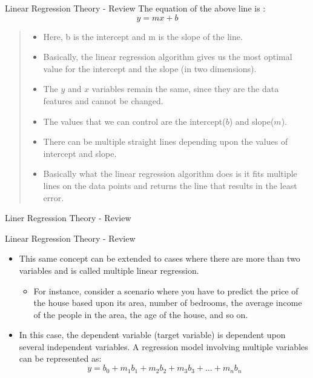 \documentclass[12pt,xcolor={dvipsnames}]{beamer}
\begin{document}
\begin{frame}[shrink=10]{Linear Regression Theory - Review}
The equation of the above line is :
$$ y= mx + b $$

\begin{quote}\small{
\begin{itemize}
\item Here, b is the intercept and m is the slope of the line.
\item Basically,
the linear regression algorithm gives us the most optimal value for the
intercept and the slope (in two dimensions).
\item The $y$ and $x$ variables
remain the same, since they are the data features and cannot be changed.
\item The values that we can control are the intercept($b$) and slope($m$).
\item There
can be multiple straight lines depending upon the values of intercept
and slope.
\item  Basically what the linear regression algorithm does is it
fits multiple lines on the data points and returns the line that results
in the least error.
\end{itemize}}
\end{quote}
\end{frame}

\begin{frame}{Liner Regression Theory - Review}
\begin{center}
\end{center}
\end{frame}

\begin{frame}{Linear Regression Theory - Review}
\begin{itemize}
\item This same concept can be extended to cases where there are more than two
variables and is called multiple linear regression.
\begin{itemize}
\item For instance, consider a scenario where you have to predict the price of the house
based upon its area, number of bedrooms, the average income of the
people in the area, the age of the house, and so on.
\end{itemize}
\item In this case, the dependent variable (target variable) is dependent upon several
independent variables. A regression model involving multiple variables
can be represented as:
$$y = b_0 + m_1b_1 + m_2b_2 + m_3b_3 + \dotsc + m_nb_n$$
\end{itemize}
\end{frame}
\end{document}
